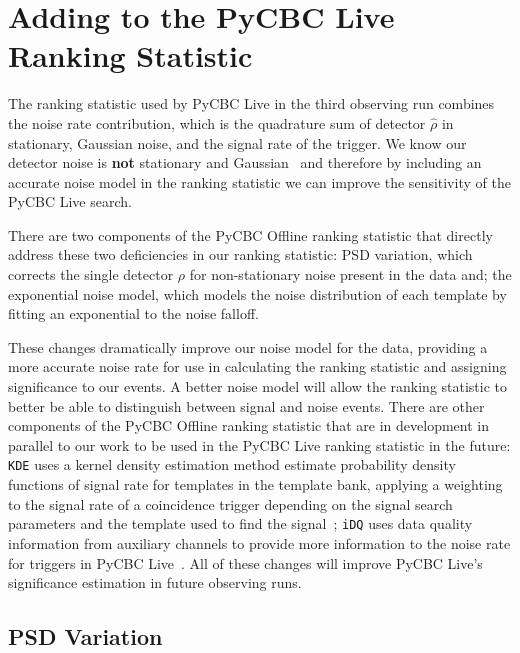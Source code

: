 \section{\label{5:new-additions}Adding to the PyCBC Live Ranking Statistic}

The ranking statistic used by PyCBC Live in the third observing run combines the noise rate contribution, which is the quadrature sum of detector $\hat{\rho}$ in stationary, Gaussian noise, and the signal rate of the trigger. We know our detector noise is \textbf{not} stationary and Gaussian~\cite{LIGO_data_quality:2015} and therefore by including an accurate noise model in the ranking statistic we can improve the sensitivity of the PyCBC Live search.

There are two components of the PyCBC Offline ranking statistic that directly address these two deficiencies in our ranking statistic: PSD variation, which corrects the single detector $\rho$ for non-stationary noise present in the data and; the exponential noise model, which models the noise distribution of each template by fitting an exponential to the noise falloff.

These changes dramatically improve our noise model for the data, providing a more accurate noise rate for use in calculating the ranking statistic and assigning significance to our \gwadj events. A better noise model will allow the ranking statistic to better be able to distinguish between signal and noise events. There are other components of the PyCBC Offline ranking statistic that are in development in parallel to our work to be used in the PyCBC Live ranking statistic in the future: \verb|KDE| uses a kernel density estimation method estimate probability density functions of signal rate for templates in the template bank, applying a weighting to the signal rate of a coincidence trigger depending on the signal search parameters and the template used to find the signal~\cite{PyCBC_focussed_bbh:2024}; \verb|iDQ| uses data quality information from auxiliary channels to provide more information to the noise rate for triggers in PyCBC Live~\cite{iDQ:2020}. All of these changes will improve PyCBC Live's significance estimation in future observing runs. 

\subsection{\label{5:sec:psd-var}PSD Variation}


